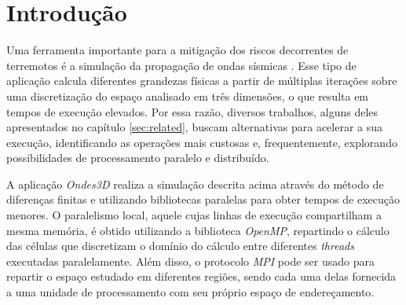 \documentclass[cic,tc]{iiufrgs}
\begin{document}
\tableofcontents


\chapter{Introdução}
Uma ferramenta importante para a mitigação dos riscos decorrentes de terremotos é a simulação da propagação de ondas sísmicas \cite{Dupros2010HighperformanceFS}. Esse tipo de aplicação
calcula diferentes grandezas físicas a partir de múltiplas iterações sobre uma discretização do espaço analisado em três dimensões, o que resulta em tempos de execução elevados. Por essa razão,
diversos trabalhos, alguns deles apresentados no capítulo \ref{sec:related}, buscam alternativas para acelerar a sua execução, identificando as operações mais custosas e, frequentemente,
explorando possibilidades de processamento paralelo e distribuído.

A aplicação \textit{Ondes3D} realiza a simulação descrita acima através do método de diferenças finitas e utilizando bibliotecas paralelas para obter tempos de execução menores. O
paralelismo local, aquele cujas linhas de execução compartilham a mesma memória, é obtido utilizando a biblioteca \textit{OpenMP}, repartindo o cálculo das células que discretizam o
domínio do cálculo entre diferentes \textit{threads} executadas paralelamente. Além disso, o protocolo \textit{MPI} pode ser usado para repartir o espaço estudado em diferentes regiões,
sendo cada uma delas fornecida a uma unidade de processamento com seu próprio espaço de endereçamento.
\end{document}
